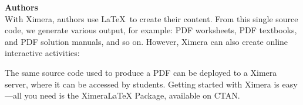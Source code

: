 \documentclass[twocolumn]{article}
\begin{document}
    \begin{xframe}
        {\sffamily\bfseries Authors}\\
        With Ximera, authors use \LaTeX\ to create their content. From this
        single
        source code, we generate various output, for example: PDF worksheets,
        PDF
        textbooks, and	PDF solution manuals, and so on. However, Ximera can
        also create
        online interactive activities:
        \begin{center}
        \end{center}
        The same source code used to produce a PDF can be deployed to a Ximera
        server, where it can be accessed by students. Getting started with
        Ximera
        is
        easy---all you need is the XimeraLaTeX Package, available on CTAN.
    \end{xframe}
\end{document}

